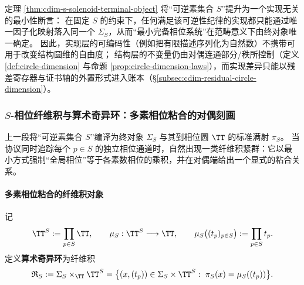 \begin{remark}[实现层编码与结构圆维的严格分离]\label{rem:cdim-solenoid-terminal-separation}
定理 \ref{thm:cdim-s-solenoid-terminal-object} 将“可逆素集合 \(S\)”提升为一个实现无关的最小性断言：
在固定 \(S\) 的约束下，任何满足该可逆性纪律的实现都只能通过唯一因子化映射落入同一个 \(\Sigma_S\)，从而“最小完备相位系统”在范畴意义下由终对象唯一确定。
因此，实现层的可编码性（例如把有限描述序列化为自然数）不携带可用于改变结构圆维的自由度；
结构层的不变量仍由对偶连通部分/秩所控制（定义 \ref{def:circle-dimension} 与命题 \ref{prop:circle-dimension-laws}），而实现差异只能以残差寄存器与证书轴的外置形式进入账本（\S\ref{subsec:cdim-residual-circle-dimension}）。
\end{remark}



\subsubsection{\texorpdfstring{$S$}{S}-相位纤维积与算术奇异环：多素相位粘合的对偶刻画}\label{subsubsec:cdim-solenoid-arithmetic-singular-ring}
上一段将“可逆素集合 \(S\)”编译为终对象 \(\Sigma_S\) 与其到相位圆 \(\TT\) 的标准满射 \(\pi_S\)。
当协议同时追踪每个 \(p\in S\) 的独立相位通道时，自然出现一类纤维积紧群：它以最小方式强制“全局相位”等于各素数相位的乘积，并在对偶端给出一个显式的粘合关系。

\paragraph{多素相位粘合的纤维积对象}
记
\[
\TT^{S}:=\prod_{p\in S}\TT,
\qquad
\mu_S:\TT^{S}\longrightarrow \TT,
\qquad
\mu_S\bigl((t_p)_{p\in S}\bigr):=\prod_{p\in S} t_p.
\]
定义\textbf{算术奇异环}为纤维积
\begin{equation}\label{eq:cdim-arithmetic-singular-ring-definition}
\mathfrak{R}_S
:=\Sigma_S\times_{\TT}\TT^{S}
=\bigl\{(x,(t_p))\in\Sigma_S\times\TT^{S}:\ \pi_S(x)=\mu_S((t_p))\bigr\}.
\end{equation}

